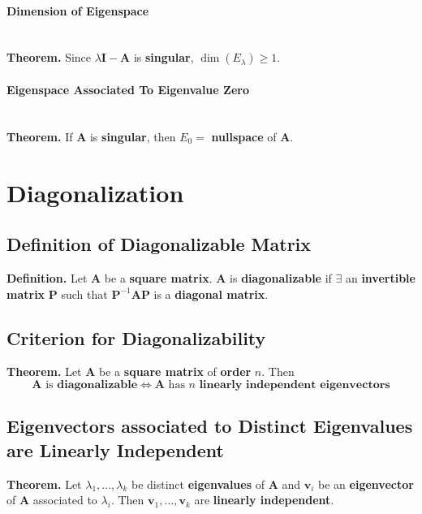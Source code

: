 \documentclass[../ma2001_notes.tex]{subfiles}
\begin{document}
\paragraph{Dimension of Eigenspace}\,\\
\textbf{Theorem.} Since \(\lambda\bm{I}-\bm{A}\) is \textbf{singular}, \(\dim(E_\lambda)\geq1\).

\paragraph{Eigenspace Associated To Eigenvalue Zero}\,\\
\textbf{Theorem.} If \(\bm{A}\) is \textbf{singular}, then \(E_0=\) \textbf{nullspace} of \(\bm{A}\).

\section{Diagonalization}
\subsection{Definition of Diagonalizable Matrix}
\textbf{Definition.} Let \(\bm{A}\) be a \textbf{square matrix}. \(\bm{A}\) is \textbf{diagonalizable} if \(\exists\) an \textbf{invertible matrix} \(\bm{P}\) such that \(\bm{P}^{-1}\bm{AP}\) is a \textbf{diagonal matrix}.

\subsection{Criterion for Diagonalizability}
\textbf{Theorem.} Let \(\bm{A}\) be a \textbf{square matrix} of \textbf{order} \(n\). Then
\[\bm{A}\text{ is }\textbf{diagonalizable}\Leftrightarrow\bm{A}\text{ has }n\textbf{ linearly independent eigenvectors}\]

\subsection{Eigenvectors associated to Distinct Eigenvalues are Linearly Independent}
\textbf{Theorem.} Let \(\lambda_1,\ldots,\lambda_k\) be distinct \textbf{eigenvalues} of \(\bm{A}\) and \(\bm{v}_i\) be an \textbf{eigenvector} of \(\bm{A}\) associated to \(\lambda_i\). Then \(\bm{v}_1,\ldots,\bm{v}_k\) are \textbf{linearly independent}.
\end{document}
